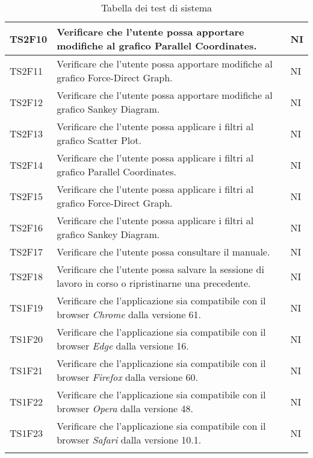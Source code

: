 \begin{center}
\begin{longtable}{|p{1.5cm}|p{11cm}|p{1cm}|}
            \rowcolor[HTML]{EFEFEF}
            TS2F10 & Verificare che l’utente possa apportare modifiche al grafico Parallel Coordinates. & NI\\ \hline
            \rowcolor[HTML]{C0C0C0}
            TS2F11 & Verificare che l’utente possa apportare modifiche al grafico Force-Direct Graph. & NI\\ \hline
            \rowcolor[HTML]{EFEFEF}
            TS2F12 & Verificare che l’utente possa apportare modifiche al grafico Sankey Diagram. & NI\\ \hline
            \rowcolor[HTML]{C0C0C0}
            TS2F13 & Verificare che l’utente possa applicare i filtri al grafico Scatter Plot. & NI\\ \hline
            \rowcolor[HTML]{EFEFEF}
            TS2F14 & Verificare che l’utente possa applicare i filtri al grafico Parallel Coordinates. & NI\\ \hline
            \rowcolor[HTML]{C0C0C0}
            TS2F15 & Verificare che l’utente possa applicare i filtri al grafico Force-Direct Graph. & NI\\ \hline
            \rowcolor[HTML]{EFEFEF}
            TS2F16 & Verificare che l’utente possa applicare i filtri al grafico Sankey Diagram. & NI\\ \hline
            \rowcolor[HTML]{C0C0C0}
            TS2F17 & Verificare che l’utente possa consultare il manuale. & NI\\ \hline
            \rowcolor[HTML]{EFEFEF}
            TS2F18 & Verificare che l’utente possa salvare la sessione di lavoro in corso o ripristinarne una precedente. & NI\\ \hline
            \rowcolor[HTML]{C0C0C0}
            TS1F19 & Verificare che l'applicazione sia compatibile con il browser \textit{Chrome} dalla versione 61. & NI\\ \hline
            \rowcolor[HTML]{EFEFEF}
            TS1F20 & Verificare che l'applicazione sia compatibile con il browser \textit{Edge} dalla versione 16. & NI\\ \hline
            \rowcolor[HTML]{C0C0C0}
            TS1F21 & Verificare che l'applicazione sia compatibile con il browser \textit{Firefox} dalla versione 60. & NI\\ \hline
            \rowcolor[HTML]{EFEFEF}
            TS1F22 & Verificare che l'applicazione sia compatibile con il browser \textit{Opera} dalla versione 48. & NI\\ \hline
            \rowcolor[HTML]{C0C0C0}
            TS1F23 & Verificare che l'applicazione sia compatibile con il browser \textit{Safari} dalla versione 10.1. & NI\\ \hline
            \caption{Tabella dei test di sistema}
        \end{longtable}
    \end{center}

